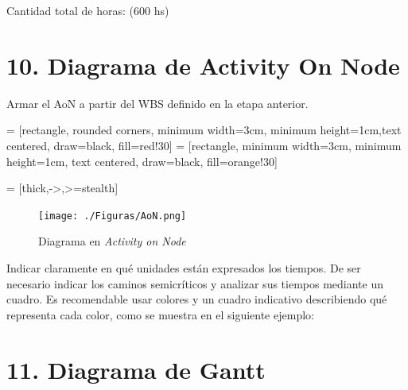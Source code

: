 \documentclass[
11pt, %
]{charter}
\begin{document}
Cantidad total de horas: (600 hs)

\section{10. Diagrama de Activity On Node}
\label{sec:AoN}



Armar el AoN a partir del WBS definido en la etapa anterior. 


 = [rectangle, rounded corners, minimum width=3cm, minimum height=1cm,text centered, draw=black, fill=red!30]
 = [rectangle, minimum width=3cm, minimum height=1cm, text centered, draw=black, fill=orange!30]

 = [thick,->,>=stealth]


\begin{figure}[htpb]
\centering 
\texttt{[image: ./Figuras/AoN.png]}
\caption{Diagrama en \textit{Activity on Node}}
\label{fig:AoN}
\end{figure}

Indicar claramente en qué unidades están expresados los tiempos.
De ser necesario indicar los caminos semicríticos y analizar sus tiempos mediante un cuadro.
Es recomendable usar colores y un cuadro indicativo describiendo qué representa cada color, como se muestra en el siguiente ejemplo:



\section{11. Diagrama de Gantt}
\label{sec:gantt}
\end{document}
